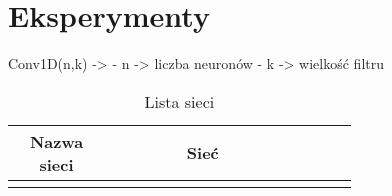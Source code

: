 \newpage %
\section{Eksperymenty}


Conv1D(n,k) ->
- n -> liczba neuronów
- k -> wielkość filtru

\begin{longtable}{| c | m{0.58\linewidth} | r | m{0.1\linewidth} |}
    \caption{Lista sieci}                                          \\
    \hline
    Nazwa sieci                    & \multicolumn{1}{c|}{Sieć}     \\ \hline\hline \endfirsthead

    \endfoot
    \hline \endlastfoot




\end{longtable}
